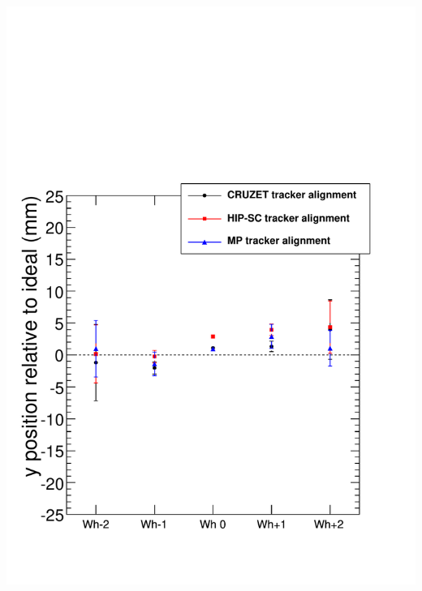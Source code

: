 \documentclass[compress]{beamer}
\begin{document}
\begin{frame}
{\begin{columns}
\includegraphics[width=\linewidth]{compare_tracker_alignment_y.pdf}
\end{columns}}
\end{frame}
\end{document}
